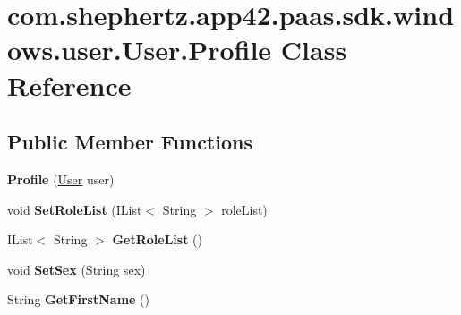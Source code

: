 \hypertarget{classcom_1_1shephertz_1_1app42_1_1paas_1_1sdk_1_1windows_1_1user_1_1_user_1_1_profile}{\section{com.\+shephertz.\+app42.\+paas.\+sdk.\+windows.\+user.\+User.\+Profile Class Reference}
\label{classcom_1_1shephertz_1_1app42_1_1paas_1_1sdk_1_1windows_1_1user_1_1_user_1_1_profile}
}
\subsection*{Public Member Functions}
\begin{DoxyCompactItemize}
\item 
\hypertarget{classcom_1_1shephertz_1_1app42_1_1paas_1_1sdk_1_1windows_1_1user_1_1_user_1_1_profile_add0067274485c9c01f2eedbee86814a5}{{\bfseries Profile} (\hyperlink{classcom_1_1shephertz_1_1app42_1_1paas_1_1sdk_1_1windows_1_1user_1_1_user}{User} user)}\label{classcom_1_1shephertz_1_1app42_1_1paas_1_1sdk_1_1windows_1_1user_1_1_user_1_1_profile_add0067274485c9c01f2eedbee86814a5}

\item 
\hypertarget{classcom_1_1shephertz_1_1app42_1_1paas_1_1sdk_1_1windows_1_1user_1_1_user_1_1_profile_aca85583956d836d938a8494ba4ed80b9}{void {\bfseries Set\+Role\+List} (I\+List$<$ String $>$ role\+List)}\label{classcom_1_1shephertz_1_1app42_1_1paas_1_1sdk_1_1windows_1_1user_1_1_user_1_1_profile_aca85583956d836d938a8494ba4ed80b9}

\item 
\hypertarget{classcom_1_1shephertz_1_1app42_1_1paas_1_1sdk_1_1windows_1_1user_1_1_user_1_1_profile_a54e6d796a1f4aa1fc99f732b973045ab}{I\+List$<$ String $>$ {\bfseries Get\+Role\+List} ()}\label{classcom_1_1shephertz_1_1app42_1_1paas_1_1sdk_1_1windows_1_1user_1_1_user_1_1_profile_a54e6d796a1f4aa1fc99f732b973045ab}

\item 
\hypertarget{classcom_1_1shephertz_1_1app42_1_1paas_1_1sdk_1_1windows_1_1user_1_1_user_1_1_profile_a31df08bd307d51c985d770bc27650ef8}{void {\bfseries Set\+Sex} (String sex)}\label{classcom_1_1shephertz_1_1app42_1_1paas_1_1sdk_1_1windows_1_1user_1_1_user_1_1_profile_a31df08bd307d51c985d770bc27650ef8}

\item 
\hypertarget{classcom_1_1shephertz_1_1app42_1_1paas_1_1sdk_1_1windows_1_1user_1_1_user_1_1_profile_adb81019114f91e7012d6a2ad6075e0d6}{String {\bfseries Get\+First\+Name} ()}\label{classcom_1_1shephertz_1_1app42_1_1paas_1_1sdk_1_1windows_1_1user_1_1_user_1_1_profile_adb81019114f91e7012d6a2ad6075e0d6}


\end{DoxyCompactItemize}
